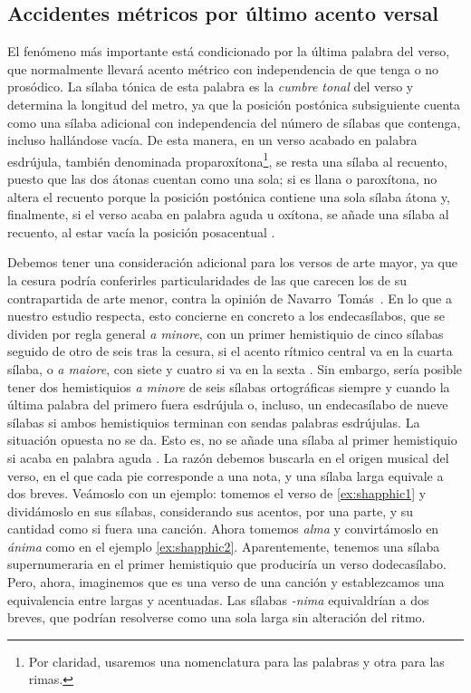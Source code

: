 \subsection{Accidentes métricos por último acento versal}
El fenómeno más importante está condicionado por la última palabra del verso, que normalmente llevará acento métrico con independencia de que tenga o no prosódico. La sílaba tónica de esta palabra es la \textit{cumbre tonal} \parencite[17-18]{balbin1968} del verso y determina la longitud del metro, ya que la posición postónica subsiguiente cuenta como una sílaba adicional con independencia del número de sílabas que contenga, incluso hallándose vacía. De esta manera, en un verso acabado en palabra esdrújula, también denominada proparoxítona\footnote{Por claridad, usaremos una nomenclatura para las palabras y otra para las rimas.}, se resta una sílaba al recuento, puesto que las dos átonas cuentan como una sola; si es llana o paroxítona, no altera el recuento porque la posición postónica contiene una sola sílaba átona y, finalmente, si el verso acaba en palabra aguda u oxítona, se añade una sílaba al recuento, al estar vacía la posición posacentual \parencites[60-65]{dominguez2014a}[43-44]{quilis2013}.

Debemos tener una consideración adicional para los versos de arte mayor, ya que la cesura podría conferirles particularidades de las que carecen los de su contrapartida de arte menor, contra la opinión de Navarro~Tomás~\parencite*[40]{navarrotomas1991}. En lo que a nuestro estudio respecta, esto concierne en concreto a los endecasílabos, que se dividen por regla general \textit{a minore}, con un primer hemistiquio de cinco sílabas seguido de otro de seis tras la cesura, si el acento rítmico central va en la cuarta sílaba, o \textit{a maiore}, con siete y cuatro si va en la sexta \parencite[136]{baehr1997}. Sin embargo, sería posible tener dos hemistiquios \textit{a minore} de seis sílabas ortográficas siempre y cuando la última palabra del primero fuera esdrújula o, incluso, un endecasílabo de nueve sílabas si ambos hemistiquios terminan con sendas palabras esdrújulas. La situación opuesta no se da. Esto es, no se añade una sílaba al primer hemistiquio si acaba en palabra aguda \parencite[389-393]{martinez1938}. La razón debemos buscarla en el origen musical del verso, en el que cada pie corresponde a una nota, y una sílaba larga equivale a dos breves. Veámoslo con un ejemplo: tomemos el verso de \ref{ex:shapphic1} y dividámoslo en sus sílabas, considerando sus acentos, por una parte, y su cantidad como si fuera una canción. Ahora tomemos \textit{alma} y convirtámoslo en \textit{ánima} como en el ejemplo \ref{ex:shapphic2}. Aparentemente, tenemos una sílaba supernumeraria en el primer hemistiquio que produciría un verso dodecasílabo. Pero, ahora, imaginemos que es una verso de una canción y establezcamos una equivalencia entre largas y acentuadas. Las sílabas \textit{-nima}  equivaldrían a dos breves, que podrían resolverse como una sola larga sin alteración del ritmo.

